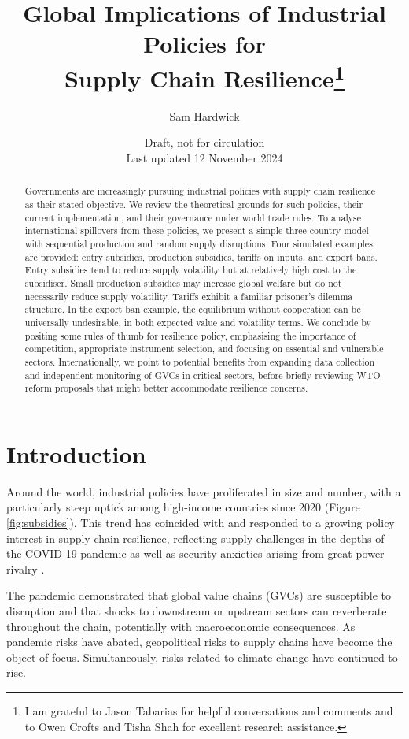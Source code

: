 \documentclass{article}
\title{Global Implications of Industrial Policies for \\ Supply Chain Resilience\thanks{I am grateful to Jason Tabarias for helpful conversations and comments and to Owen Crofts and Tisha Shah for excellent research assistance.}}
\author{Sam Hardwick}
\date{Draft, not for circulation \\ Last updated 12 November 2024}
\begin{document}
\maketitle
\begin{abstract}
    Governments are increasingly pursuing industrial policies with supply chain resilience as their stated objective. We review the theoretical grounds for such policies, their current implementation, and their governance under world trade rules. To analyse international spillovers from these policies, we present a simple three-country model with sequential production and random supply disruptions. Four simulated examples are provided: entry subsidies, production subsidies, tariffs on inputs, and export bans. Entry subsidies tend to reduce supply volatility but at relatively high cost to the subsidiser. Small production subsidies may increase global welfare but do not necessarily reduce supply volatility. Tariffs exhibit a familiar prisoner's dilemma structure. In the export ban example, the equilibrium without cooperation can be universally undesirable, in both expected value and volatility terms. We conclude by positing some rules of thumb for resilience policy, emphasising the importance of competition, appropriate instrument selection, and focusing on essential and vulnerable sectors. Internationally, we point to potential benefits from expanding data collection and independent monitoring of GVCs in critical sectors, before briefly reviewing WTO reform proposals that might better accommodate resilience concerns.
\end{abstract}

\section{Introduction}

Around the world, industrial policies have proliferated in size and number, with a particularly steep uptick among high-income countries since 2020 (Figure \ref{fig:subsidies}). This trend has coincided with and responded to a growing policy interest in supply chain resilience, reflecting supply challenges in the depths of the COVID-19 pandemic as well as security anxieties arising from great power rivalry \parencite{ilyina_industrial_2024}.

The pandemic demonstrated that global value chains (GVCs) are susceptible to disruption and that shocks to downstream or upstream sectors can reverberate throughout the chain, potentially with macroeconomic consequences. As pandemic risks have abated, geopolitical risks to supply chains have become the object of focus. Simultaneously, risks related to climate change have continued to rise.
\end{document}
